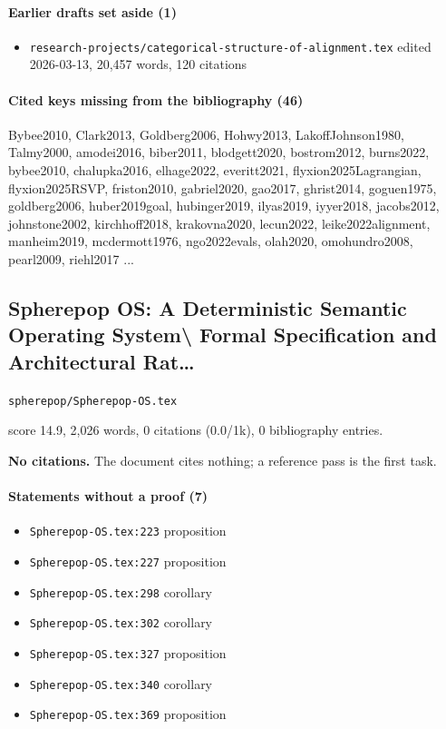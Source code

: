\documentclass[11pt]{article}
\newcommand{\loc}[1]{{\small\color{muted}\texttt{#1}}}
\begin{document}
\paragraph{Earlier drafts set aside (1)}
\begin{itemize}
\item \loc{research-projects/\allowbreak{}categorical-structure-of-alignment.tex} edited 2026-03-13, 20,457 words, 120 citations
\end{itemize}
\paragraph{Cited keys missing from the bibliography (46)}
{\small\ttfamily\raggedright Bybee2010, Clark2013, Goldberg2006, Hohwy2013, LakoffJohnson1980, Talmy2000, amodei2016, biber2011, blodgett2020, bostrom2012, burns2022, bybee2010, chalupka2016, elhage2022, everitt2021, flyxion2025Lagrangian, flyxion2025RSVP, friston2010, gabriel2020, gao2017, ghrist2014, goguen1975, goldberg2006, huber2019goal, hubinger2019, ilyas2019, iyyer2018, jacobs2012, johnstone2002, kirchhoff2018, krakovna2020, lecun2022, leike2022alignment, manheim2019, mcdermott1976, ngo2022evals, olah2020, omohundro2008, pearl2009, riehl2017 ...\par}
\subsection{Spherepop OS: A Deterministic Semantic Operating System\textbackslash{} Formal Specification and Architectural Rat\ldots{}}
\loc{spherepop/\allowbreak{}Spherepop-OS.tex}\par
score 14.9, 2,026 words, 0 citations (0.0/1k), 0 bibliography entries.

\textbf{No citations.} The document cites nothing; a reference pass is the first task.

\paragraph{Statements without a proof (7)}
\begin{itemize}
\item \loc{Spherepop-OS.tex:223} proposition
\item \loc{Spherepop-OS.tex:227} proposition
\item \loc{Spherepop-OS.tex:298} corollary
\item \loc{Spherepop-OS.tex:302} corollary
\item \loc{Spherepop-OS.tex:327} proposition
\item \loc{Spherepop-OS.tex:340} corollary
\item \loc{Spherepop-OS.tex:369} proposition
\end{itemize}
\end{document}
